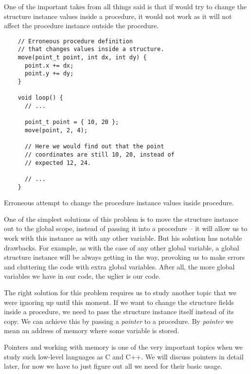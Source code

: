 \documentclass[../sparc.tex]{subfiles}
\begin{document}
One of the important takes from all things said is that if would try to change
the structure instance values inside a procedure, it would not work as it will
not affect the procedure instance outside the procedure.

\begin{listing}[H]
  \begin{verbatim}
    // Erroneous procedure definition
    // that changes values inside a structure.
    move(point_t point, int dx, int dy) {
      point.x += dx;
      point.y += dy;
    }

    void loop() {
      // ...

      point_t point = { 10, 20 };
      move(point, 2, 4);

      // Here we would find out that the point
      // coordinates are still 10, 20, instead of
      // expected 12, 24.

      // ...
    }
  \end{verbatim}
  \caption{Erroneous attempt to change the procedure instance values inside
    procedure.}
  \label{listing:game-dev-structure-usage-01}
\end{listing}

One of the simplest solutions of this problem is to move the structure instance
out to the global scope, instead of passing it into a procedure -- it will allow
us to work with this instance as with any other variable.  But his solution has
notable drawbacks.  For example, as with the case of any other global variable,
a global structure instance will be always getting in the way, provoking us to
make errors and cluttering the code with extra global variables.  After all, the
more global variables we have in our code, the uglier is our code.

 The right solution for this problem requires us to
study another topic that we were ignoring up until this moment.  If we want to
change the structure fields inside a procedure, we need to pass the structure
instance itself instead of its copy.  We can achieve this by passing a
\emph{pointer} to a procedure.  By \emph{pointer} we mean an address of memory
where some variable is stored.

Pointers and working with memory is one of the very important topics when we
study such low-level languages as C and C++.  We will discuss pointers in detail
later, for now we have to just figure out all we need for their basic usage.
\end{document}
